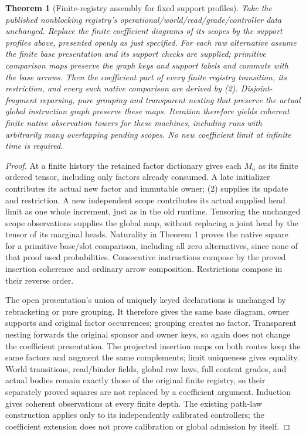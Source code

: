 \documentclass[11pt]{article}
\newtheorem{theorem}{Theorem}\newtheorem{proposition}{Proposition}\newtheorem{lemma}{Lemma}
\begin{document}
\begin{theorem}[Finite-registry assembly for fixed support profiles]
Take the published nonblocking registry's operational/world/read/grade/controller data unchanged. Replace the finite coefficient diagrams of its scopes by the support profiles above, presented openly as just specified. For each raw alternative assume the finite base presentation and its support checks are supplied; primitive comparison maps preserve the graph keys and support labels and commute with the base arrows. Then the coefficient part of every finite registry transition, its restriction, and every such native comparison are derived by (2). Disjoint-fragment reparsing, pure grouping and transparent nesting that preserve the actual global instruction graph preserve these maps. Iteration therefore yields coherent finite native observation towers for these machines, including runs with arbitrarily many overlapping pending scopes. No new coefficient limit at infinite time is required.
\end{theorem}
\begin{proof}
At a finite history the retained factor dictionary gives each $M_a$ as its finite ordered tensor, including only factors already consumed. A late initializer contributes its actual new factor and immutable owner; (2) supplies its update and restriction. A new independent scope contributes its actual supplied head limit as one whole increment, just as in the old runtime. Tensoring the unchanged scope observations supplies the global map, without replacing a joint head by the tensor of its marginal heads. Naturality in Theorem 1 proves the native square for a primitive base/slot comparison, including all zero alternatives, since none of that proof used probabilities. Consecutive instructions compose by the proved insertion coherence and ordinary arrow composition. Restrictions compose in their reverse order.

The open presentation's union of uniquely keyed declarations is unchanged by rebracketing or pure grouping. It therefore gives the same base diagram, owner supports and original factor occurrences; grouping creates no factor. Transparent nesting forwards the original sponsor and owner keys, so again does not change the coefficient presentation. The projected insertion maps on both routes keep the same factors and augment the same complements; limit uniqueness gives equality. World transitions, read/binder fields, global raw laws, full content grades, and actual bodies remain exactly those of the original finite registry, so their separately proved squares are not replaced by a coefficient argument. Induction gives coherent observations at every finite depth. The existing path-law construction applies only to its independently calibrated controllers; the coefficient extension does not prove calibration or global admission by itself.
\end{proof}
\end{document}

